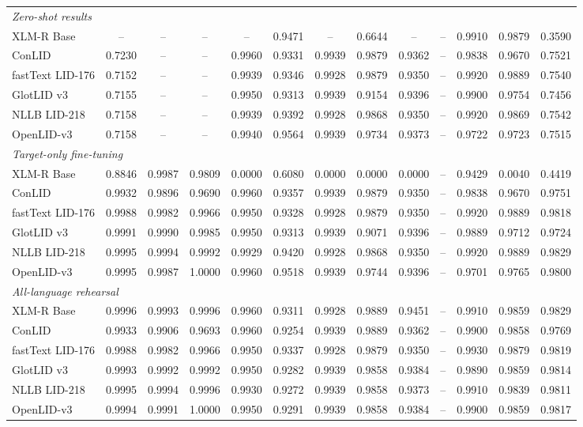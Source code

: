 \documentclass[11pt]{article}
\begin{document}
\begin{table}[p]
\begin{tabular}{l ccc cccccccc c}
\midrule
\multicolumn{13}{l}{\textit{Zero-shot results}} \\
XLM-R Base & -- & -- & -- & -- & 0.9471 & -- & 0.6644 & -- & -- & 0.9910 & 0.9879 & 0.3590 \\
ConLID & 0.7230 & -- & -- & 0.9960 & 0.9331 & 0.9939 & 0.9879 & 0.9362 & -- & 0.9838 & 0.9670 & 0.7521 \\
fastText LID-176 & 0.7152 & -- & -- & 0.9939 & 0.9346 & 0.9928 & 0.9879 & 0.9350 & -- & 0.9920 & 0.9889 & 0.7540 \\
GlotLID v3 & 0.7155 & -- & -- & 0.9950 & 0.9313 & 0.9939 & 0.9154 & 0.9396 & -- & 0.9900 & 0.9754 & 0.7456 \\
NLLB LID-218 & 0.7158 & -- & -- & 0.9939 & 0.9392 & 0.9928 & 0.9868 & 0.9350 & -- & 0.9920 & 0.9869 & 0.7542 \\
OpenLID-v3 & 0.7158 & -- & -- & 0.9940 & 0.9564 & 0.9939 & 0.9734 & 0.9373 & -- & 0.9722 & 0.9723 & 0.7515 \\
\midrule
\multicolumn{13}{l}{\textit{Target-only fine-tuning}} \\
XLM-R Base & 0.8846 & 0.9987 & 0.9809 & 0.0000 & 0.6080 & 0.0000 & 0.0000 & 0.0000 & -- & 0.9429 & 0.0040 & 0.4419 \\
ConLID & 0.9932 & 0.9896 & 0.9690 & 0.9960 & 0.9357 & 0.9939 & 0.9879 & 0.9350 & -- & 0.9838 & 0.9670 & 0.9751 \\
fastText LID-176 & 0.9988 & 0.9982 & 0.9966 & 0.9950 & 0.9328 & 0.9928 & 0.9879 & 0.9350 & -- & 0.9920 & 0.9889 & 0.9818 \\
GlotLID v3 & 0.9991 & 0.9990 & 0.9985 & 0.9950 & 0.9313 & 0.9939 & 0.9071 & 0.9396 & -- & 0.9889 & 0.9712 & 0.9724 \\
NLLB LID-218 & 0.9995 & 0.9994 & 0.9992 & 0.9929 & 0.9420 & 0.9928 & 0.9868 & 0.9350 & -- & 0.9920 & 0.9889 & 0.9829 \\
OpenLID-v3 & 0.9995 & 0.9987 & 1.0000 & 0.9960 & 0.9518 & 0.9939 & 0.9744 & 0.9396 & -- & 0.9701 & 0.9765 & 0.9800 \\
\midrule
\multicolumn{13}{l}{\textit{All-language rehearsal}} \\
XLM-R Base & 0.9996 & 0.9993 & 0.9996 & 0.9960 & 0.9311 & 0.9928 & 0.9889 & 0.9451 & -- & 0.9910 & 0.9859 & 0.9829 \\
ConLID & 0.9933 & 0.9906 & 0.9693 & 0.9960 & 0.9254 & 0.9939 & 0.9889 & 0.9362 & -- & 0.9900 & 0.9858 & 0.9769 \\
fastText LID-176 & 0.9988 & 0.9982 & 0.9966 & 0.9950 & 0.9337 & 0.9928 & 0.9879 & 0.9350 & -- & 0.9930 & 0.9879 & 0.9819 \\
GlotLID v3 & 0.9993 & 0.9992 & 0.9992 & 0.9950 & 0.9282 & 0.9939 & 0.9858 & 0.9384 & -- & 0.9890 & 0.9859 & 0.9814 \\
NLLB LID-218 & 0.9995 & 0.9994 & 0.9996 & 0.9930 & 0.9272 & 0.9939 & 0.9858 & 0.9373 & -- & 0.9910 & 0.9839 & 0.9811 \\
OpenLID-v3 & 0.9994 & 0.9991 & 1.0000 & 0.9950 & 0.9291 & 0.9939 & 0.9858 & 0.9384 & -- & 0.9900 & 0.9859 & 0.9817 \\
\bottomrule
\end{tabular}
\end{table}
\end{document}
